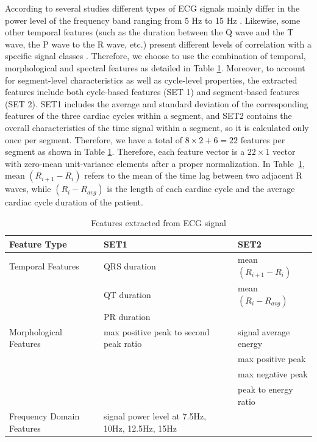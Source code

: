According to several studies different types of ECG signals mainly differ in the power level of the frequency band ranging from 5 Hz to 15 Hz \cite{martinez2004wavelet}. Likewise, some other temporal features (such as the duration between the Q wave and the T wave, the P wave to the R wave, etc.) present different levels of correlation with a specific signal classes \cite{autofs}. Therefore, we choose to use the combination of temporal, morphological and spectral features as detailed in Table \ref{table:features}. Moreover, to account for segment-level characteristics as well as cycle-level properties, the extracted features include both cycle-based features (SET 1) and segment-based features (SET 2). SET1 includes the average and standard deviation of the corresponding features of the three cardiac cycles within a segment, and SET2 contains the overall characteristics of the time signal within a segment, so it is calculated only once per segment. Therefore, we have a total of \textcolor{black}{$8 \times 2 + 6 =22$} features per segment as shown in Table \ref{table:features}. Therefore, each feature vector is a $22×1$ vector with zero-mean unit-variance elements after a proper normalization. %
In Table~\ref{table:features}, mean $(R_{i+1}-R_i)$ refers to the mean of the time lag between two adjacent R waves, while $(R_i-R_{avg})$ is the length of each cardiac cycle and the average cardiac cycle duration of the patient. 

\begin{table}[t]
	\caption{Features extracted from ECG signal}%
	\label{table:features}
	\centering
	\begin{tabular}{|m{10.5em} | m{11em} |m{11em}|}
		\hline 
		Feature Type & SET1 & SET2 \\ 
		\hline 
		Temporal Features & 
		\tabitem QRS duration & \tabitem  mean$(R_{i+1}-R_i)$ \\
		&\tabitem QT duration &\tabitem mean$(R_i-R_{avg})$ \\
		&\tabitem PR duration & \\
		\hline 
		Morphological Features & \tabitem max positive peak to second peak ratio & \tabitem signal average energy\\
		 & & \tabitem max positive peak \\ 
		 & & \tabitem max negative peak \\ 
		 & & \tabitem peak to energy ratio \\ 
		\hline 
		Frequency Domain Features & \tabitem signal power level at 7.5Hz, 10Hz, 12.5Hz, 15Hz &  \\ 
		\hline 
	\end{tabular} 
\end{table}


